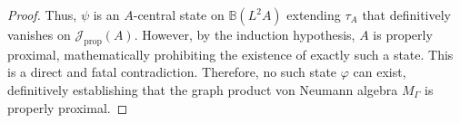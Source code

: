 \begin{proof}
Thus, $\psi$ is an $A$-central state on $\mathbb{B}(L^2A)$ extending $\tau_A$ that definitively vanishes on $\mathcal{J}_{\mathrm{prop}}(A)$. However, by the induction hypothesis, $A$ is properly proximal, mathematically prohibiting the existence of exactly such a state. 
This is a direct and fatal contradiction. Therefore, no such state $\varphi$ can exist, definitively establishing that the graph product von Neumann algebra $M_\Gamma$ is properly proximal.
\end{proof}